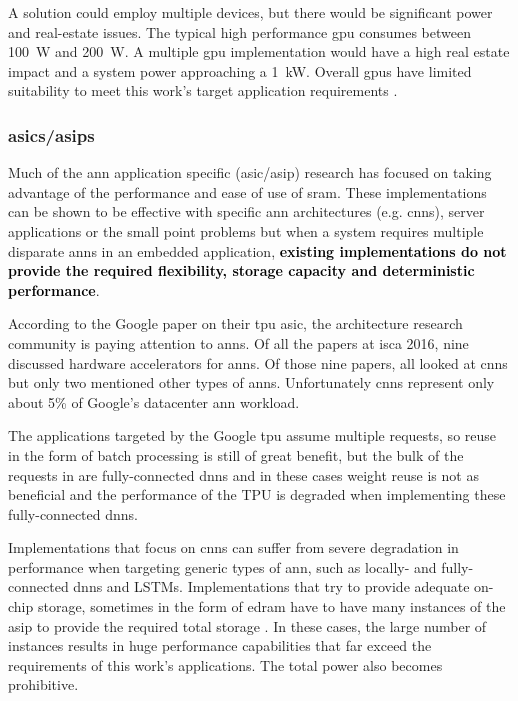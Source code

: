 A solution could employ multiple devices, but there would be significant power and real-estate issues. 
The typical high performance \ac{gpu} consumes between \SI{100}{\watt} and \SI{200}{\watt}.
A multiple \ac{gpu} implementation would have a high real estate impact and a system power approaching a \SI[per-mode=symbol]{1}{\kilo \watt}.
Overall \acp{gpu} have limited suitability to meet this work's target application requirements \cite{dadiannao2017}.


\subsubsection{\Acp{asic}/\Acp{asip}}
\label{sec:asicAndAsip}
Much of the \ac{ann} application specific (\ac{asic}/\ac{asip}) research has focused on taking advantage of the performance and ease of use of \acf{sram}.
These implementations can be shown to be effective with specific \ac{ann} architectures (e.g. \acp{cnn}), server applications or the small point problems but when a system requires multiple disparate \ac{ann}s in an embedded application, \textbf{\textcolor{black}{existing implementations do not provide the required flexibility, storage capacity and deterministic performance}}.

\iffalse Even in cloud applications, there are limitations on reuse. \fi 
According to the Google paper \cite{jouppi2017datacenter} on their \ac{tpu} \ac{asic}, the architecture research community is paying attention to \acp{ann}.
Of all the papers at \ac{isca} 2016, nine discussed hardware accelerators for \acp{ann}. Of those nine papers, all looked at \ac{cnn}s but only two mentioned other types of \acp{ann}. 
Unfortunately \ac{cnn}s represent only about 5\% of Google's datacenter \ac{ann} workload.

The applications targeted by the Google \ac{tpu} \cite{jouppi2017datacenter} assume multiple requests, so reuse in the form of batch processing is still of great benefit, but the bulk of the requests in \cite{jouppi2017datacenter} are fully-connected \ac{dnn}s and in these cases weight reuse is not as beneficial and the performance of the TPU is degraded when implementing these fully-connected \ac{dnn}s.

Implementations that focus on \ac{cnn}s can suffer from severe degradation in performance when targeting generic types of \ac{ann}, such as locally- and fully-connected \ac{dnn}s and LSTMs.
Implementations that try to provide adequate on-chip storage, sometimes in the form of \ac{edram} have to have many instances of the \ac{asip} to provide the required total storage \cite{dadiannao2017}. 
In these cases, the large number of instances results in huge performance capabilities that far exceed the requirements of this work's applications. The total power also becomes prohibitive.

